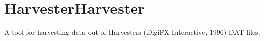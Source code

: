 \chapter{Harvester\+Harvester}
\hypertarget{index}{}\label{index}
\label{index_md_README}%
%
A tool for harvesting data out of Harvester\textquotesingle{}s (Digi\+FX Interactive, 1996) DAT files. 